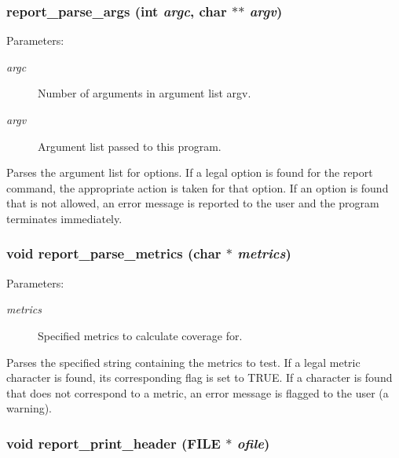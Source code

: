 \subsubsection{ report\_\-parse\_\-args (int {\em argc}, char $\ast$$\ast$ {\em argv})}\label{report_8c_a10}


\begin{Desc}
\item[Parameters: ]\par
\begin{description}
\item[{\em 
argc}]Number of arguments in argument list argv. \item[{\em 
argv}]Argument list passed to this program.\end{description}
\end{Desc}
Parses the argument list for options. If a legal option is found for the report command, the appropriate action is taken for that option. If an option is found that is not allowed, an error message is reported to the user and the program terminates immediately. 
\subsubsection{\setlength{\rightskip}{0pt plus 5cm}void report\_\-parse\_\-metrics (char $\ast$ {\em metrics})}\label{report_8c_a9}


\begin{Desc}
\item[Parameters: ]\par
\begin{description}
\item[{\em 
metrics}]Specified metrics to calculate coverage for.\end{description}
\end{Desc}
Parses the specified string containing the metrics to test. If a legal metric character is found, its corresponding flag is set to TRUE. If a character is found that does not correspond to a metric, an error message is flagged to the user (a warning). 
\subsubsection{\setlength{\rightskip}{0pt plus 5cm}void report\_\-print\_\-header (FILE $\ast$ {\em ofile})}\label{report_8c_a12}


